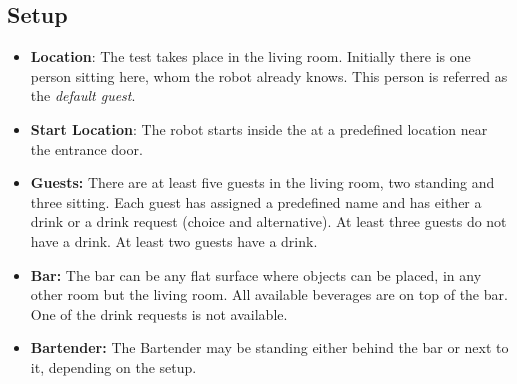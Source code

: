 \subsection*{Setup}
\begin{itemize}
	\item \textbf{Location}: The test takes place in the living room.
	Initially there is one person sitting here, whom the robot already knows.
	This person is referred as the \emph{default guest}.

	\item \textbf{Start Location}: The robot starts inside the \Arena{} at a predefined location near the entrance door.

	\item \textbf{Guests:} There are at least five guests in the living room, two standing and three sitting.
	Each guest has assigned a predefined name and has either a drink or a drink request (choice and alternative). At least three guests do not have a drink. At least two guests have a drink.

	\item \textbf{Bar:} The bar can be any flat surface where objects can be placed, in any other room but the living room.
	All available beverages are on top of the bar.
	One of the drink requests is not available.

	\item \textbf{Bartender:} The Bartender may be standing either behind the bar or next to it, depending on the \Arena{} setup.
\end{itemize}

